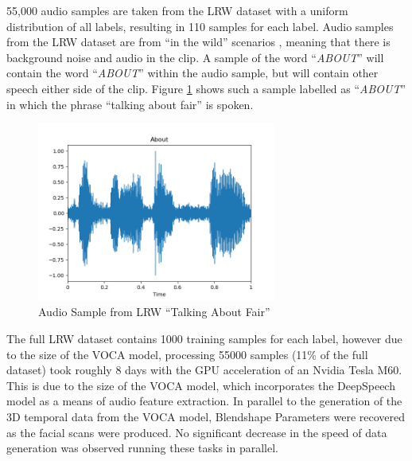 55,000 audio samples are taken from the LRW dataset with a uniform distribution of all labels, resulting in 110 samples for each label.
Audio samples from the LRW dataset are from ``in the wild'' scenarios \cite{Chung2016}, meaning that there is background noise and audio in the clip.
A sample of the word ``\textit{ABOUT}'' will contain the word ``\textit{ABOUT}'' within the audio sample, but will contain other speech either side of the clip.
Figure \ref{fig:LRW_About} shows such a sample labelled as ``\textit{ABOUT}'' in which the phrase ``talking about fair'' is spoken.

\begin{figure}[h]
    \centering
        \includegraphics[width=0.7\textwidth]{figures/dataset/about.png}
    \caption{Audio Sample from LRW \cite{Chung2016} ``Talking About Fair''}\label{fig:LRW_About}
\end{figure}

The full LRW dataset contains 1000 training samples for each label, however due to the size of the VOCA model, processing 55000 samples (11\% of the full dataset) took roughly 8 days with the GPU acceleration of an Nvidia Tesla M60.
This is due to the size of the VOCA model, which incorporates the DeepSpeech model as a means of audio feature extraction.
In parallel to the generation of the 3D temporal data from the VOCA model, Blendshape Parameters were recovered as the facial scans were produced.
No significant decrease in the speed of data generation was observed running these tasks in parallel.

